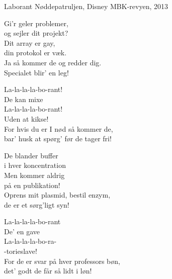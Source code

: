 \begin{song}{Laborant}
  {} %
  {Nøddepatruljen, Disney} %
  {} %
  {MBK-revyen, 2013} %
  {\NotCCLIed} %

  \begin{SBVerse}
    Gi'r geler problemer,\\
    og sejler dit projekt?\\
    Dit array er gay,\\
    din protokol er væk.\\
    Ja så kommer de og redder dig.\\
    Specialet blir' en leg!
  \end{SBVerse}

  \begin{SBChorus}
    La-la-la-la-bo-rant!\\
    De kan mixe\\
    La-la-la-la-bo-rant!\\
    Uden at kikse!\\
    For hvis du er I nød så kommer de,\\
    bar' husk at spørg' før de tager fri!
  \end{SBChorus}

  \begin{SBVerse}
    De blander buffer\\
    i hver koncentration\\
    Men kommer aldrig\\
    på en publikation!\\
    Oprens mit plasmid, bestil enzym,\\
    de er et sørg'ligt syn!
  \end{SBVerse}

  \begin{SBChorus}
    La-la-la-la-bo-rant\\
    De' en gave\\
    La-la-la-la-bo-ra-\\
    -torieslave!\\
    For de er svar på hver professors bøn,\\
    det' godt de får så lidt i løn!
  \end{SBChorus}


\end{song}
